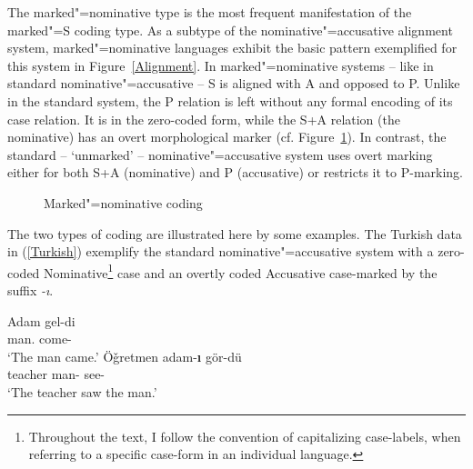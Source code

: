 The marked"=nominative  type is the most frequent manifestation of the marked"=S coding type. 
As a subtype of the nominative"=accusative alignment system, marked"=nominative languages exhibit the basic pattern exemplified for this system in Figure~\ref{Alignment}. 
In marked"=nominative systems -- like in standard nominative"=accusative -- S is aligned with A and opposed to P. 
Unlike in the standard system, the P relation is left without any formal encoding of its case relation. 
It is in the zero-coded form, while the S+A relation (the nominative) has an overt morphological marker (cf. Figure~\ref{MN alignment}). 
In contrast, the standard -- `unmarked' -- nominative"=accusative system uses overt marking either for both S+A (nominative) and P (accusative) or restricts it to P-marking. 

\begin{figure}[htbp]\centering{}
\caption{Marked"=nominative coding}\label{MN alignment}
\end{figure}

The two types of coding are illustrated here by some examples.
The Turkish data in (\ref{Turkish}) exemplify the standard nominative"=accusative system with a zero-coded Nominative\footnote{Throughout the text, I follow the convention of capitalizing case-labels, when referring to a specific case-form in an individual language.}  case and an overtly coded Accusative case-marked by the suffix \emph{-\i}. 
\enlargethispage{2\baselineskip}

\begin{exe}\ex\label{Turkish}
\begin{xlist}
\ex\label{TurkishS}\gll Adam gel-di\\
man.{\nom{}} come-\pst{}\\
\glt `The man came.'
\ex\label{TurkishAP}\gll Ö\v{g}retmen adam-\textbf{\i}{} gör-dü\\
teacher man-\acc{} see-\pst{}\\
\glt `The teacher saw the man.'
\end{xlist}
\end{exe}

